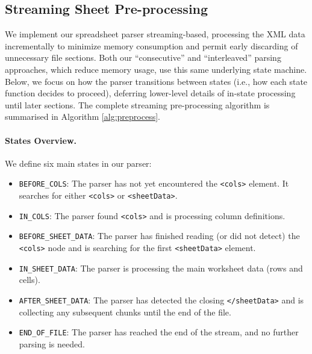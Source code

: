 \subsection{Streaming Sheet Pre-processing}



We implement our spreadsheet parser streaming-based, processing the XML data incrementally to minimize memory consumption and permit early discarding of unnecessary file sections. Both our “consecutive” and “interleaved” parsing approaches, which reduce memory usage, use this same underlying state machine. Below, we focus on how the parser transitions between states (i.e., how each state function decides to proceed), deferring lower-level details of in-state processing until later sections.
The complete streaming pre-processing algorithm is summarised in Algorithm \ref{alg:preprocess}.

\paragraph{States Overview.}
We define six main states in our parser:
\begin{itemize}
  \item \texttt{BEFORE\_COLS}: The parser has not yet encountered the \texttt{<cols>} element. It searches for either \texttt{<cols>} or \texttt{<sheetData>}.
  \item \texttt{IN\_COLS}: The parser found \texttt{<cols>} and is processing column definitions.
  \item \texttt{BEFORE\_SHEET\_DATA}: The parser has finished reading (or did not detect) the \texttt{<cols>} node and is searching for the first \texttt{<sheetData>} element.
  \item \texttt{IN\_SHEET\_DATA}: The parser is processing the main worksheet data (rows and cells).
  \item \texttt{AFTER\_SHEET\_DATA}: The parser has detected the closing \texttt{</sheetData>} and is collecting any subsequent chunks until the end of the file.
  \item \texttt{END\_OF\_FILE}: The parser has reached the end of the stream, and no further parsing is needed.
\end{itemize}


